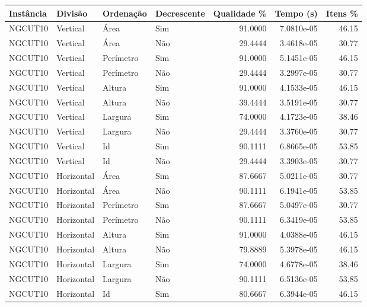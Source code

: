 \begin{tabular}{llllrrr}
\hline
Instância & Divisão     & Ordenação & Decrescente & Qualidade \% & Tempo (s)  & Itens \% \\
\hline
NGCUT10   & Vertical    & Área      & Sim         & 91.0000      & 7.0810e-05 & 46.15    \\
NGCUT10   & Vertical    & Área      & Não         & 29.4444      & 3.4618e-05 & 30.77    \\
NGCUT10   & Vertical    & Perímetro & Sim         & 91.0000      & 5.1451e-05 & 46.15    \\
NGCUT10   & Vertical    & Perímetro & Não         & 29.4444      & 3.2997e-05 & 30.77    \\
NGCUT10   & Vertical    & Altura    & Sim         & 91.0000      & 4.1533e-05 & 46.15    \\
NGCUT10   & Vertical    & Altura    & Não         & 39.4444      & 3.5191e-05 & 30.77    \\
NGCUT10   & Vertical    & Largura   & Sim         & 74.0000      & 4.1723e-05 & 38.46    \\
NGCUT10   & Vertical    & Largura   & Não         & 29.4444      & 3.3760e-05 & 30.77    \\
NGCUT10   & Vertical    & Id        & Sim         & 90.1111      & 6.8665e-05 & 53.85    \\
NGCUT10   & Vertical    & Id        & Não         & 29.4444      & 3.3903e-05 & 30.77    \\
NGCUT10   & Horizontal  & Área      & Sim         & 87.6667      & 5.0211e-05 & 30.77    \\
NGCUT10   & Horizontal  & Área      & Não         & 90.1111      & 6.1941e-05 & 53.85    \\
NGCUT10   & Horizontal  & Perímetro & Sim         & 87.6667      & 5.0497e-05 & 30.77    \\
NGCUT10   & Horizontal  & Perímetro & Não         & 90.1111      & 6.3419e-05 & 53.85    \\
NGCUT10   & Horizontal  & Altura    & Sim         & 91.0000      & 4.0388e-05 & 46.15    \\
NGCUT10   & Horizontal  & Altura    & Não         & 79.8889      & 5.3978e-05 & 46.15    \\
NGCUT10   & Horizontal  & Largura   & Sim         & 74.0000      & 4.6778e-05 & 38.46    \\
NGCUT10   & Horizontal  & Largura   & Não         & 90.1111      & 6.5136e-05 & 53.85    \\
NGCUT10   & Horizontal  & Id        & Sim         & 80.6667      & 6.3944e-05 & 46.15    \\

\end{tabular}
